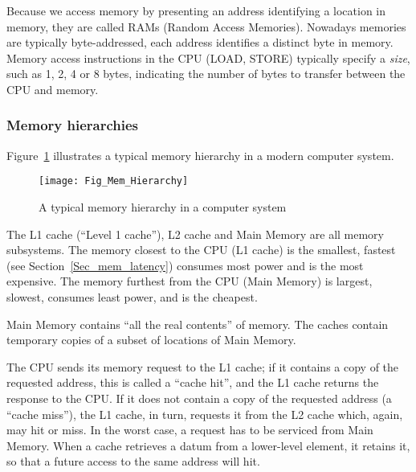 
Because we access memory by presenting an address identifying a
location in memory, they are called RAMs (Random Access Memories).
Nowadays memories are typically byte-addressed, {\ie} each address
identifies a distinct byte in memory.  Memory access instructions in
the CPU (LOAD, STORE) typically specify a \emph{size}, such as 1, 2, 4
or 8 bytes, indicating the number of bytes to transfer between the CPU
and memory.


\subsubsection{Memory hierarchies}


Figure~\ref{Fig_Mem_Hierarchy} illustrates a typical memory hierarchy
in a modern computer system.
\begin{figure}[htbp]
  \centerline{\texttt{[image: Fig\_Mem\_Hierarchy]}}
  \caption{\label{Fig_Mem_Hierarchy}
           A typical memory hierarchy in a computer system}
\end{figure}
The L1 cache (``Level 1 cache''), L2 cache and Main Memory are all
memory subsystems.  The memory closest to the CPU (L1 cache) is the
smallest, fastest (see Section~\ref{Sec_mem_latency}) consumes most
power and is the most expensive.  The memory furthest from the CPU
(Main Memory) is largest, slowest, consumes least power, and is the
cheapest.

Main Memory contains ``all the real contents'' of memory.  The caches
contain temporary copies of a subset of locations of Main Memory.


The CPU sends its memory request to the L1 cache; if it contains a
copy of the requested address, this is called a ``cache hit'', and the
L1 cache returns the response to the CPU.  If it does not contain a
copy of the requested address (a ``cache miss''), the L1 cache, in
turn, requests it from the L2 cache which, again, may hit or miss.  In
the worst case, a request has to be serviced from Main Memory.  When a
cache retrieves a datum from a lower-level element, it retains it, so
that a future access to the same address will hit.

